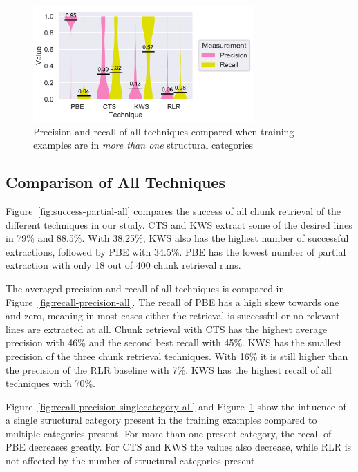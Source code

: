 \documentclass[\myrootdir/main.tex]{subfiles}
\begin{document}
\begin{figure}[htbp]
		\centering
		\includegraphics[width=0.75\textwidth, clip]{img/big-study/recall-precision-multicategory-all.pdf}
		\caption{Precision and recall of all techniques compared when training examples are in \emph{more than one} structural categories}
		\label{fig:recall-precision-multicategory-all}
\end{figure}

\subsection{Comparison of All Techniques}
Figure~\ref{fig:success-partial-all} compares the success of all chunk retrieval of the different techniques in our study.
CTS and KWS extract some of the desired lines in 79\% and 88.5\%.
With 38.25\%, KWS also has the highest number of successful extractions, followed by PBE with 34.5\%.
PBE has the lowest number of partial extraction with only 18 out of 400 chunk retrieval runs.

The averaged precision and recall of all techniques is compared in Figure~\ref{fig:recall-precision-all}.
The recall of PBE has a high skew towards one and zero, meaning in most cases either the retrieval is successful or no relevant lines are extracted at all.
Chunk retrieval with CTS has the highest average precision with 46\% and the second best recall with 45\%.
KWS has the smallest precision of the three chunk retrieval techniques.
With 16\% it is still higher than the precision of the RLR baseline with 7\%.
KWS has the highest recall of all techniques with 70\%.

Figure~\ref{fig:recall-precision-singlecategory-all} and Figure~\ref{fig:recall-precision-multicategory-all} show the influence of a single structural category present in the training examples compared to multiple categories present.
For more than one present category, the recall of PBE decreases greatly.
For CTS and KWS the values also decrease, while RLR is not affected by the number of structural categories present.
\end{document}
